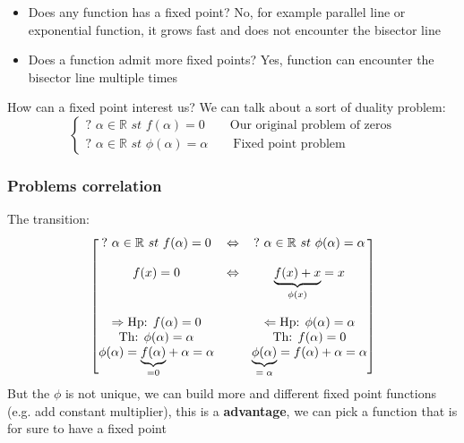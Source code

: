 \begin{figure}[!ht]
    \begin{minipage}{\linewidth}
        \centering
    \end{minipage}
\end{figure}

\begin{itemize}
    \item Does any function has a fixed point? No, for example parallel line or exponential function, it grows fast and does not encounter the bisector line
    \item Does a function admit more fixed points? Yes, function can encounter the bisector line multiple times
\end{itemize}
How can a fixed point interest us? We can talk about a sort of duality problem:
$$
\begin{cases}
    ?\,\,\alpha\in\mathbb{R}\,\,st\,\,f(\alpha)=0\qquad\text{Our original problem of zeros}\\
    ?\,\,\alpha\in\mathbb{R}\,\,st\,\,\phi(\alpha)=\alpha\qquad\text{Fixed point problem}
\end{cases}
$$

\subsubsection{Problems correlation}
The transition:
$$
\begin{bmatrix}
    ?\,\,\alpha\in\mathbb{R}\,\,st\,\,f(\alpha)=0 & \Leftrightarrow & ?\,\,\alpha\in\mathbb{R}\,\,st\,\,\phi(\alpha)=\alpha\\
    \\
    f(x)=0 & \Leftrightarrow & \underlabel{f(x)+x}{$\phi(x)$}=x
    \\
    \\
    \Rightarrow \text{Hp: }f(\alpha)=0 & &\Leftarrow\text{Hp: }\phi(\alpha)=\alpha\\
    \text{Th: }\phi(\alpha)=\alpha & & \text{Th: }f(\alpha)=0\\
    \phi(\alpha)=\underlabel{f(\alpha)}{=0}+\alpha=\alpha & & \underlabel{\phi(\alpha)}{$=\alpha$}=f(\alpha)+\alpha=\alpha
\end{bmatrix}
$$
But the $\phi$ is not unique, we can build more and different fixed point functions (e.g. add constant multiplier), this is a \textbf{advantage}, we can pick a function that is for sure to have a fixed point

